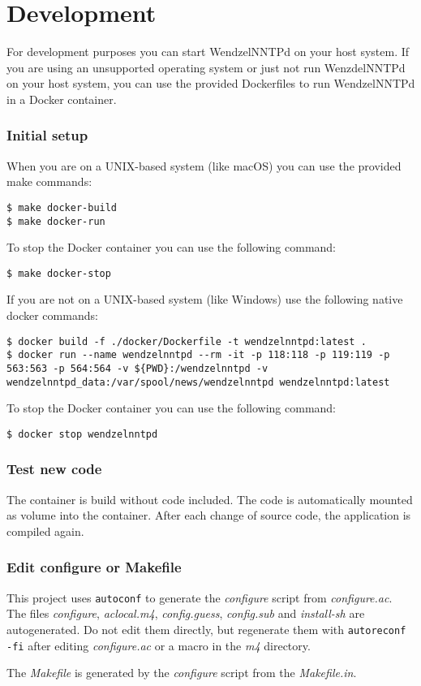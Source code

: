 \chapter{Development}

For development purposes you can start WendzelNNTPd on your host system. If you are using an unsupported operating system or just not run WenzdelNNTPd on your host system, you can use the provided Dockerfiles to run WendzelNNTPd in a Docker container.

\subsection{Initial setup}
When you are on a UNIX-based system (like macOS) you can use the provided make commands:
\begin{verbatim}
$ make docker-build
$ make docker-run
\end{verbatim}
To stop the Docker container you can use the following command:
\begin{verbatim}
$ make docker-stop
\end{verbatim}
If you are not on a UNIX-based system (like Windows) use the following native docker commands:
\begin{verbatim}
$ docker build -f ./docker/Dockerfile -t wendzelnntpd:latest .
$ docker run --name wendzelnntpd --rm -it -p 118:118 -p 119:119 -p 563:563 -p 564:564 -v ${PWD}:/wendzelnntpd -v wendzelnntpd_data:/var/spool/news/wendzelnntpd wendzelnntpd:latest
\end{verbatim}
To stop the Docker container you can use the following command:
\begin{verbatim}
$ docker stop wendzelnntpd
\end{verbatim}

\subsection{Test new code}
The container is build without code included. The code is automatically mounted as volume into the container. After each change of source code, the application is compiled again.

\subsection{Edit configure or Makefile}
This project uses \texttt{autoconf} to generate the \textit{configure} script from \textit{configure.ac}. The files
\textit{configure}, \textit{aclocal.m4}, \textit{config.guess}, \textit{config.sub} and \textit{install-sh} are
autogenerated. Do not edit them directly, but regenerate them with \texttt{autoreconf -fi} after editing
\textit{configure.ac} or a macro in the \textit{m4} directory.

The \textit{Makefile} is generated by the \textit{configure} script from the \textit{Makefile.in}.
